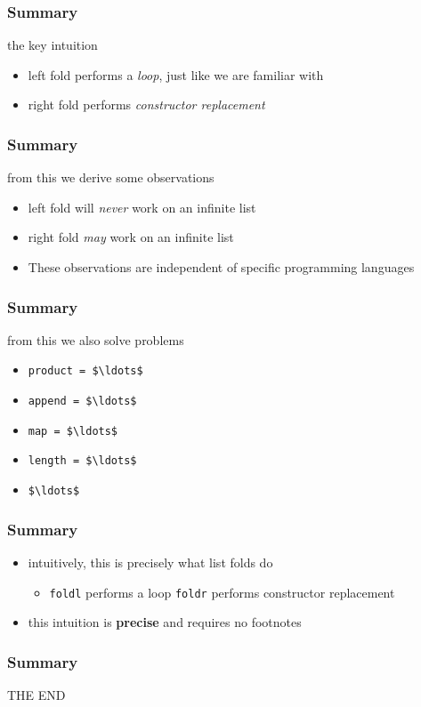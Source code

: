 \begin{frame}
\frametitle{Summary}
\begin{block}{the key intuition}
\begin{itemize}
\item left fold performs a \emph{loop}, just like we are familiar with
\item right fold performs \emph{constructor replacement}
\end{itemize}
\end{block}
\end{frame}

\begin{frame}
\frametitle{Summary}
\begin{block}{from this we derive some observations}
\begin{itemize}
\item left fold will \emph{never} work on an infinite list
\item right fold \emph{may} work on an infinite list
\item These observations are independent of specific programming languages
\end{itemize}
\end{block}
\end{frame}

\begin{frame}[fragile]
\frametitle{Summary}
\begin{block}{from this we also solve problems}
\begin{itemize}
\item \lstinline[mathescape]{product = $\ldots$}
\item \lstinline[mathescape]{append = $\ldots$}
\item \lstinline[mathescape]{map = $\ldots$}
\item \lstinline[mathescape]{length = $\ldots$}
\item \lstinline[mathescape]{$\ldots$}
\end{itemize}
\end{block}
\end{frame}

\begin{frame}
\frametitle{Summary}
\begin{block}{}
\begin{itemize}
\item intuitively, this is precisely what list folds do
  \begin{itemize}
  \item \lstinline[basicstyle=\ttfamily]$foldl$ performs a loop
  \lstinline[basicstyle=\ttfamily]$foldr$ performs constructor replacement
  \end{itemize}
\item this intuition is \textbf{precise} and requires no footnotes
\end{itemize}
\end{block}
\end{frame}

\begin{frame}
\frametitle{Summary}
\begin{center}
THE END
\end{center}
\end{frame}
